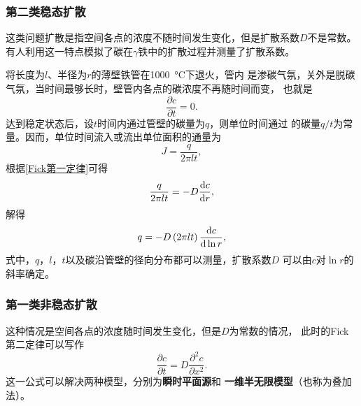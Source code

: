             \subsubsection{第二类稳态扩散}
                这类问题扩散是指空间各点的浓度不随时间发生变化，但是扩散系数$D$不是常数。
                有人利用这一特点模拟了碳在$\gamma$铁中的扩散过程并测量了扩散系数。

                将长度为$l$、半径为$r$的薄壁铁管在\SI{1000}{\celsius}下退火，管内
                是渗碳气氛，关外是脱碳气氛，当时间最够长时，壁管内各点的碳浓度不再随时间而变，
                也就是
                \begin{equation}
                    \frac{\partial c}{\partial t}=0.
                \end{equation}
                达到稳定状态后，设$t$时间内通过管壁的碳量为$q$，则单位时间通过
                的碳量$q/t$为常量。因而，单位时间流入或流出单位面积的通量为
                \begin{equation}
                    J=\frac{q}{2\pi lt},
                \end{equation}
                根据\autoref{Fick第一定律}可得
                \begin{equation}
                    \frac{q}{2\pi lt}=-D\frac{\mathop{}\!\mathrm{d} c}{\mathop{}\!\mathrm{d} r},
                \end{equation}
                解得
                \begin{equation}
                    q=-D\left( 2\pi lt \right)\frac{\mathop{}\!\mathrm{d} c}{\mathop{}\!\mathrm{d} \ln r},
                \end{equation}
                式中，$q$，$l$，$t$以及碳沿管壁的径向分布都可以测量，扩散系数$D$
                可以由$c$对$\ln r$的斜率确定。

            \subsubsection{第一类非稳态扩散}
                这种情况是空间各点的浓度随时间发生变化，但是$D$为常数的情况，
                此时的Fick第二定律可以写作
                \begin{equation}
                    \frac{\partial c}{\partial t}=D \frac{\partial^{2} c}{\partial x^{2}}.
                \end{equation}
                这一公式可以解决两种模型，分别为\textbf{瞬时平面源}和
                \textbf{一维半无限模型}（也称为叠加法）。

